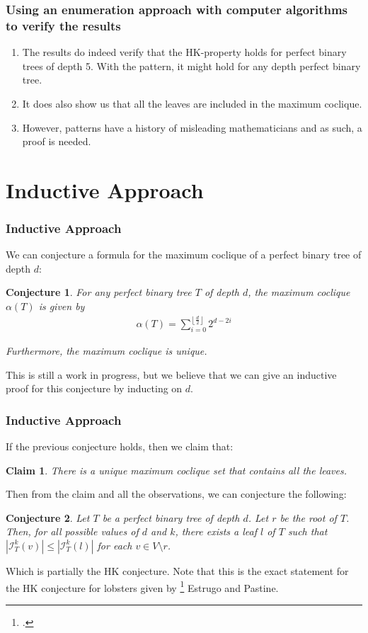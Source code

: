 \documentclass[10pt,]{beamer}
\theoremstyle{conjectureStyle}
\newtheorem*{conjecture}{Conjecture}
\theoremstyle{notationStyle}
\theoremstyle{claimStyle}
\newtheorem*{claim}{Claim}
\begin{document}
\begin{frame}\frametitle{Using an enumeration approach with computer algorithms to verify the results}
    \begin{enumerate}[<+->]
        \item The results do indeed verify that the HK-property holds for perfect binary trees of depth 5. With the pattern, it might hold for any depth perfect binary tree.
        \item It does also show us that all the leaves are included in the maximum coclique.
        \item However, patterns have a history of misleading mathematicians and as such, a proof is needed.
    \end{enumerate}
\end{frame}

\section{Inductive Approach}
\begin{frame}\frametitle{Inductive Approach}
    We can conjecture a formula for the maximum coclique of a perfect binary tree of depth $d$:

    \begin{conjecture}
        For any perfect binary tree $T$ of depth $d$, the maximum coclique $\alpha(T)$ is given by
        \begin{align*}
            \alpha(T) = \sum_{i= 0}^{\left\lfloor\frac{d}{2}\right\rfloor} 2^{d - 2i}
        \end{align*}

        Furthermore, the maximum coclique is unique.
    \end{conjecture}

    This is still a work in progress, but we believe that we can give an inductive proof for this conjecture by inducting on $d$.
\end{frame}

\begin{frame}\frametitle{Inductive Approach}
    If the previous conjecture holds, then we claim that:

    \begin{claim}
        There is a unique maximum coclique set that contains all the leaves.
    \end{claim}

    Then from the claim and all the observations, we can conjecture the following:

    \begin{conjecture}
        Let $T$ be a perfect binary tree of depth $d$. Let $r$ be the root of $T$. Then, for all possible values of $d$ and $k$, there exists a leaf $l$ of $T$ such that $|\mathcal{I}^k_T(v)| \leq |\mathcal{I}^k_T(l)|$ for each $v \in V\setminus{r}$.
    \end{conjecture}

    Which is partially the HK conjecture. Note that this is the exact statement for the HK conjecture for lobsters given by \footcite{MR4245360} Estrugo and Pastine.
\end{frame}
\end{document}
